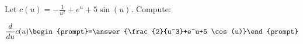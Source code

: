 \documentclass{ximera}
\author{Bart Snapp}
\begin{document}
\begin{exercise}

Let $c(u) = -\frac{1}{u^2}+e^u+5 \sin (u)$. Compute:

\[
\frac{d}{du}c(u)
\begin{prompt}=\answer{\frac{2}{u^3}+e^u+5 \cos (u)}\end{prompt}
\]
\end{exercise}
\end{document}

